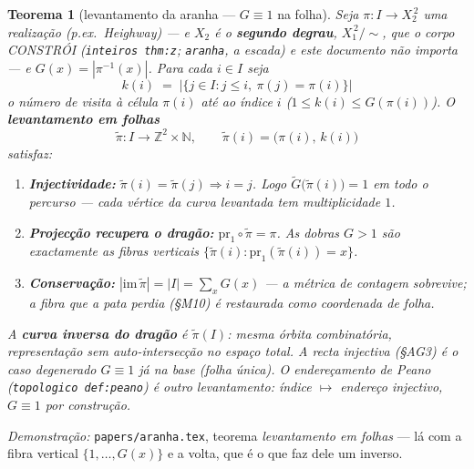 \documentclass[11pt,a4paper]{article}
\newcommand{\code}[1]{\texttt{\small #1}}
\newtheorem{teorema}{Teorema}
\begin{document}
\begin{teorema}[levantamento da aranha --- $G\equiv1$ na folha]\label{thm:aranha-inversa}
Seja $\pi\colon I\to X_2^{\,2}$ uma realização (p.ex.\ Heighway) --- e $X_2$
é o \textbf{segundo degrau}, $X_1^{\,2}/{\sim}$, que o corpo CONSTRÓI
(\code{inteiros thm:z}; \code{aranha}, a escada) e este documento não importa --- e
$G(x)=|\pi^{-1}(x)|$. Para cada $i\in I$ seja
\[
k(i)\;=\;\bigl|\{j\in I:j\le i,\ \pi(j)=\pi(i)\}\bigr|
\]
o número de visita à célula $\pi(i)$ até ao índice $i$
($1\le k(i)\le G(\pi(i))$). O \textbf{levantamento em folhas}
\[
\tilde\pi\colon I\longrightarrow\mathbb{Z}^{2}\times\mathbb{N},\qquad
\tilde\pi(i)=\bigl(\pi(i),\,k(i)\bigr)
\]
satisfaz:
\begin{enumerate}\itemsep2pt
\item \textbf{Injectividade:} $\tilde\pi(i)=\tilde\pi(j)\Rightarrow i=j$.
      Logo $\tilde G\bigl(\tilde\pi(i)\bigr)=1$ em todo o percurso --- cada
      vértice da curva levantada tem multiplicidade $1$.
\item \textbf{Projecção recupera o dragão:}
      $\mathrm{pr}_{1}\circ\tilde\pi=\pi$. As dobras $G>1$ são exactamente
      as fibras verticais $\{\tilde\pi(i):\mathrm{pr}_{1}(\tilde\pi(i))=x\}$.
\item \textbf{Conservação:} $|\mathrm{im}\,\tilde\pi|=|I|=\sum_x G(x)$
      --- a métrica de contagem sobrevive; a fibra que a pata perdia
      (§M10) é restaurada como coordenada de folha.
\end{enumerate}
A \textbf{curva inversa do dragão} é $\tilde\pi(I)$: mesma órbita
combinatória, representação sem auto-intersecção no espaço total.
A recta injectiva (§AG3) é o caso degenerado $G\equiv1$ já na base
(folha única). O endereçamento de Peano (\code{topologico def:peano})
é outro levantamento: índice $\mapsto$ endereço injectivo, $G\equiv1$
por construção.
\end{teorema}

\noindent\emph{Demonstração:} \code{papers/aranha.tex}, teorema
\emph{levantamento em folhas} --- lá com a fibra vertical $\{1,\dots,G(x)\}$ e a
volta, que é o que faz dele um inverso.
\end{document}
